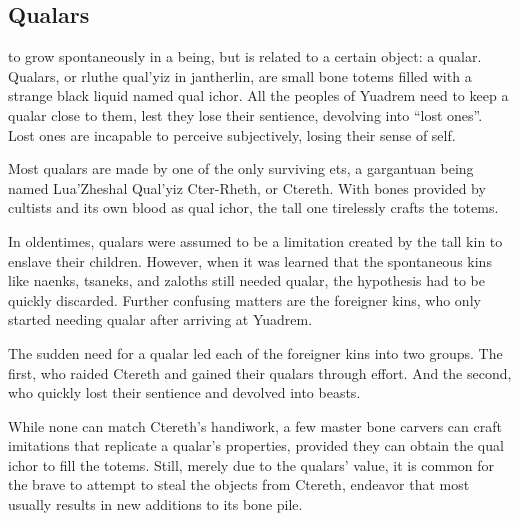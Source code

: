 \begin{linenumbers}
\subsection*{Qualars}
to grow spontaneously in a being, but is related to a certain object: a qualar.
Qualars, or rluthe qual'yiz in jantherlin, are small bone totems filled with a strange black liquid named qual ichor.
All the peoples of Yuadrem need to keep a qualar close to them, lest they lose their sentience, devolving into ``lost ones''.
Lost ones are incapable to perceive subjectively, losing their sense of self.

Most qualars are made by one of the only surviving ets, a gargantuan being named Lua'Zheshal Qual'yiz Cter-Rheth, or Ctereth.
With bones provided by cultists and its own blood as qual ichor, the tall one tirelessly crafts the totems.

In oldentimes, qualars were assumed to be a limitation created by the tall kin to enslave their children.
However, when it was learned that the spontaneous kins like naenks, tsaneks, and zaloths still needed qualar, the hypothesis had to be quickly discarded.
Further confusing matters are the foreigner kins, who only started needing qualar after arriving at Yuadrem.

The sudden need for a qualar led each of the foreigner kins into two groups.
The first, who raided Ctereth and gained their qualars through effort.
And the second, who quickly lost their sentience and devolved into beasts.

While none can match Ctereth's handiwork, a few master bone carvers can craft imitations that replicate a qualar's properties, provided they can obtain the qual ichor to fill the totems.
Still, merely due to the qualars' value, it is common for the brave to attempt to steal the objects from Ctereth, endeavor that most usually results in new additions to its bone pile.
\end{linenumbers}
